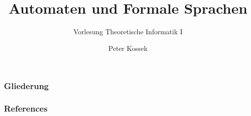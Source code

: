 \documentclass[18pt,aspectratio=169]{beamer}
\title{Automaten und Formale Sprachen}
\subtitle{Vorlesung Theoretische Informatik I}
\author{Peter Kossek}
\institute{Berufsakademie Sachsen, Staatliche Studienakademie Leipzig} %
\date{}
\begin{document}
\begin{frame}
	\titlepage
\end{frame}

\begin{frame}
	\frametitle{Gliederung}
	\tableofcontents
\end{frame}



\begin{frame}
	\frametitle{References}
	
\end{frame}
\end{document}
